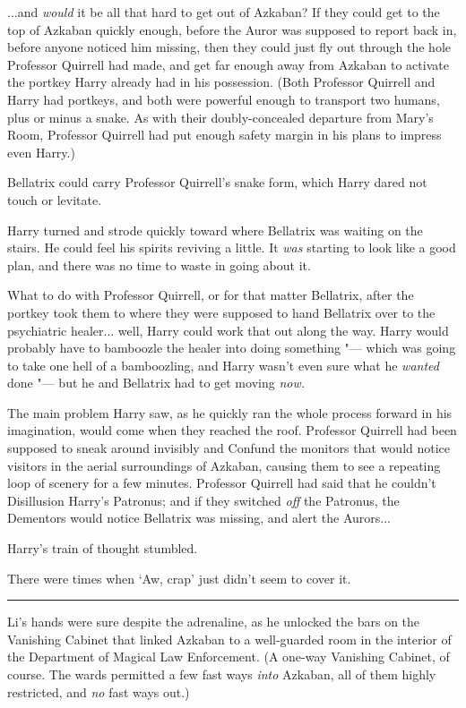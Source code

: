 ...and \emph{would} it be all that hard to get out of Azkaban? If
they could get to the top of Azkaban quickly enough, before the Auror
was supposed to report back in, before anyone noticed him missing, then
they could just fly out through the hole Professor Quirrell had made,
and get far enough away from Azkaban to activate the portkey Harry
already had in his possession. (Both Professor Quirrell and Harry had
portkeys, and both were powerful enough to transport two humans, plus or
minus a snake. As with their doubly-concealed departure from Mary's
Room, Professor Quirrell had put enough safety margin in his plans to
impress even Harry.)

Bellatrix could carry Professor Quirrell's snake form, which Harry dared
not touch or levitate.

Harry turned and strode quickly toward where Bellatrix was waiting on
the stairs. He could feel his spirits reviving a little. It \emph{was}
starting to look like a good plan, and there was no time to waste in
going about it.

What to do with Professor Quirrell, or for that matter Bellatrix, after
the portkey took them to where they were supposed to hand Bellatrix over
to the psychiatric healer... well, Harry could work that out along
the way. Harry would probably have to bamboozle the healer into doing
something "--- which was going to take one hell of a bamboozling, and Harry
wasn't even sure what he \emph{wanted} done "--- but he and Bellatrix had
to get moving \emph{now.}

The main problem Harry saw, as he quickly ran the whole process forward
in his imagination, would come when they reached the roof. Professor
Quirrell had been supposed to sneak around invisibly and Confund the
monitors that would notice visitors in the aerial surroundings of
Azkaban, causing them to see a repeating loop of scenery for a few
minutes. Professor Quirrell had said that he couldn't Disillusion
Harry's Patronus; and if they switched \emph{off} the Patronus, the
Dementors would notice Bellatrix was missing, and alert the
Aurors...

Harry's train of thought stumbled.

There were times when `Aw, crap' just didn't seem to cover it.

\begin{center}\rule{3in}{0.4pt}\end{center}

Li's hands were sure despite the adrenaline, as he unlocked the bars on
the Vanishing Cabinet that linked Azkaban to a well-guarded room in the
interior of the Department of Magical Law Enforcement. (A one-way
Vanishing Cabinet, of course. The wards permitted a few fast ways
\emph{into} Azkaban, all of them highly restricted, and \emph{no} fast
ways out.)

